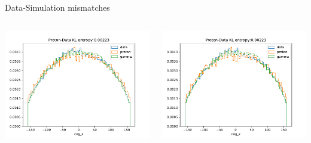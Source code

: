 \begin{frame}[t]{Data-Simulation mismatches}
\begin{columns}[onlytextwidth]
    \begin{column}{0.475\textwidth}
        \includegraphics[width=1.1\textwidth,page=11]{fig/feature_comp_cuts_thresh.pdf}
    \end{column}
    \begin{column}{0.475\textwidth}
        \includegraphics[width=1.1\textwidth,page=6]{fig/feature_comp_cuts_thresh.pdf}
    \end{column}
\end{columns}
\end{frame}


